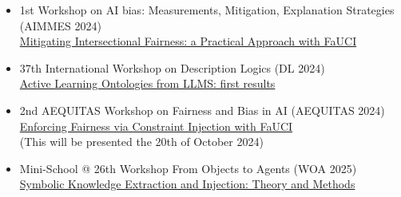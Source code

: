 \documentclass[11pt]{article}
\begin{document}
\begin{itemize}
	\item 1st Workshop on AI bias: Measurements, Mitigation, Explanation Strategies (AIMMES 2024)
	\\\href{https://apice.unibo.it/xwiki/bin/view/Talk/IntersectionalityAimmes2024}{Mitigating Intersectional Fairness: a Practical Approach with FaUCI}
	\item 37th International Workshop on Description Logics (DL 2024)
	\\\href{https://dl2024.w.uib.no/overview/}{Active Learning Ontologies from LLMS: first results}
	\item 2nd AEQUITAS Workshop on Fairness and Bias in AI (AEQUITAS 2024)
	\\\href{https://aequitas-aod.github.io/aequitas-ecai24.github.io/}{Enforcing Fairness via Constraint Injection with FaUCI}
	\\(This will be presented the 20th of October 2024)
	\item Mini-School @ 26th Workshop From Objects to Agents (WOA 2025)
	\\\href{https://sites.google.com/view/woa2025/mini-school?}{Symbolic Knowledge Extraction and Injection: Theory and Methods}
\end{itemize}
\end{document}

